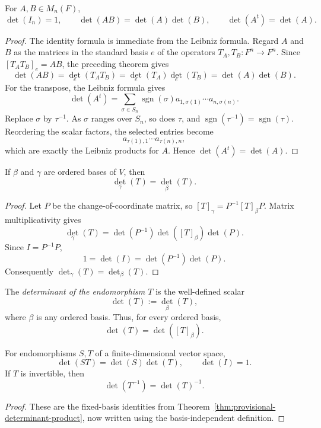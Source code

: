 \begin{corollary}
\label{thm:det-identities}
For \(A,B\in M_n(F)\),
\[
\det(I_n)=1,\qquad
\det(AB)=\det(A)\det(B),\qquad
\det(A^t)=\det(A).
\]
\end{corollary}
\begin{proof}
The identity formula is immediate from the Leibniz formula.  Regard \(A\)
and \(B\) as the matrices in the standard basis \(e\) of the operators
\(T_A,T_B:F^n\to F^n\).  Since \([T_AT_B]_e=AB\), the preceding theorem gives
\[
\det(AB)=\det_e(T_AT_B)
=\det_e(T_A)\det_e(T_B)=\det(A)\det(B).
\]
For the transpose, the Leibniz formula gives
\[
\det(A^t)=
\sum_{\sigma\in S_n}\operatorname{sgn}(\sigma)
a_{1,\sigma(1)}\cdots a_{n,\sigma(n)}.
\]
Replace \(\sigma\) by \(\tau^{-1}\).  As \(\sigma\) ranges over \(S_n\), so
does \(\tau\), and \(\operatorname{sgn}(\tau^{-1})
=\operatorname{sgn}(\tau)\).  Reordering the scalar factors, the selected
entries become
\[
a_{\tau(1),1}\cdots a_{\tau(n),n},
\]
which are exactly the Leibniz products for \(A\).  Hence
\(\det(A^t)=\det(A)\).
\end{proof}

\begin{theorem}
\label{thm:operator-determinant-basis-independent}
If \(\beta\) and \(\gamma\) are ordered bases of \(V\), then
\[
\det_\gamma(T)=\det_\beta(T).
\]
\end{theorem}
\begin{proof}
Let \(P\) be the change-of-coordinate matrix, so
\([T]_\gamma=P^{-1}[T]_\beta P\).  Matrix multiplicativity gives
\[
\det_\gamma(T)
=\det(P^{-1})\det([T]_\beta)\det(P).
\]
Since \(I=P^{-1}P\),
\[
1=\det(I)=\det(P^{-1})\det(P).
\]
Consequently \(\det_\gamma(T)=\det_\beta(T)\).
\end{proof}

\begin{definition}
The \emph{determinant of the endomorphism \(T\)} is the well-defined scalar
\[
\det(T):=\det_\beta(T),
\]
where \(\beta\) is any ordered basis.  Thus, for every ordered basis,
\begin{equation}\label{eq:operator-matrix-det}
\det(T)=\det([T]_\beta).
\end{equation}
\end{definition}

\begin{corollary}
For endomorphisms \(S,T\) of a finite-dimensional vector space,
\[
\det(ST)=\det(S)\det(T),\qquad \det(I)=1.
\]
If \(T\) is invertible, then
\[
\det(T^{-1})=\det(T)^{-1}.
\]
\end{corollary}
\begin{proof}
These are the fixed-basis identities from
Theorem~\ref{thm:provisional-determinant-product}, now written using the
basis-independent definition.
\end{proof}

